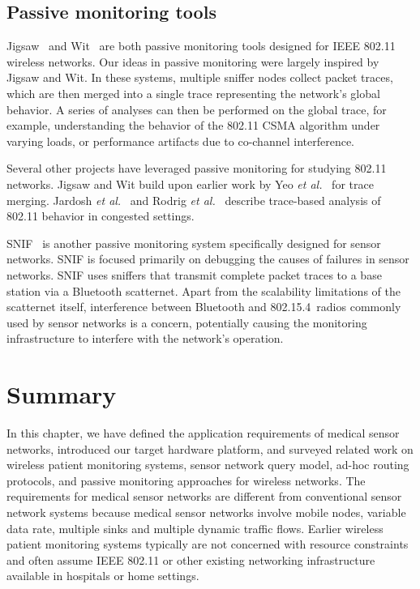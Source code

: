 \subsection{Passive monitoring tools}
Jigsaw~\cite{jigsaw} and Wit~\cite{wit} are both passive monitoring tools
designed for IEEE 802.11 wireless networks. Our ideas in passive monitoring
were largely inspired by Jigsaw and Wit. In
these systems, multiple sniffer nodes collect packet traces, which
are then merged into a single trace representing the network's global
behavior. A series of analyses can then be performed on the global
trace, for example, understanding the behavior of the 802.11 CSMA
algorithm under varying loads, or performance artifacts due to
co-channel interference. 

Several other projects have leveraged passive monitoring for studying
802.11 networks. Jigsaw and Wit build upon earlier work by Yeo
{\em et al.}~\cite{yeo-wise04} for trace merging.
Jardosh {\em et al.}~\cite{jardosh-congestion} and Rodrig {\em et
al.}~\cite{rodrig-sigcomm05} describe trace-based analysis of 802.11
behavior in congested settings.


SNIF~\cite{snif-demo-ewsn07} is another passive monitoring system specifically
designed for sensor networks. 
SNIF is focused primarily on debugging
the causes of failures in sensor networks. SNIF uses sniffers that transmit
complete packet traces to a base station via a Bluetooth scatternet.
Apart from the scalability limitations of the scatternet itself,
interference between Bluetooth and 802.15.4~radios commonly used by
sensor networks is a concern, potentially causing the monitoring
infrastructure to interfere with the network's
operation. 

\section{Summary}

In this chapter, we have defined the application requirements of medical sensor
networks, introduced our target hardware platform, and surveyed related work
on wireless patient monitoring systems, sensor network query model, ad-hoc
routing protocols, and passive monitoring approaches for wireless networks.
The requirements for medical sensor networks are different from conventional
sensor network systems because medical sensor networks involve mobile nodes,
variable data rate, multiple sinks and multiple dynamic traffic flows. Earlier
wireless patient monitoring systems typically are not concerned with
resource constraints and often assume IEEE 802.11 or other existing networking
infrastructure available in hospitals or home settings. 

